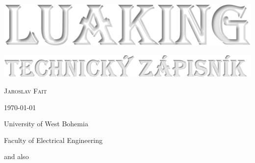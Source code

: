 \begin{titlepage}
\BgThispage
  \begin{center}
    \vspace*{2cm}
    \includegraphics[width=0.9\linewidth]{luaking_title2.png}\par
    \vspace{1cm}
    \includegraphics[width=0.8\linewidth]{luaking_title3.png}\par
    \vspace{1cm}
    {\textcolor{black!5}{\Large\textsc{Jaroslav Fait}}\par}
    \vspace{1\baselineskip}
    {\textcolor{black!5}{\large\today}\par}
    \vfill
    {\textcolor{black!10}{University of West Bohemia}\par}
    {\textcolor{black!10}{Faculty of Electrical Engineering}\par}
    \vspace{0.3cm}
    {\textcolor{black!10}{\footnotesize\luatexbanner}\par}
    {\textcolor{black!10}{\footnotesize and also \KOMAScriptVersion}}
    \vspace*{0.3cm} 
  \end{center}
\end{titlepage}